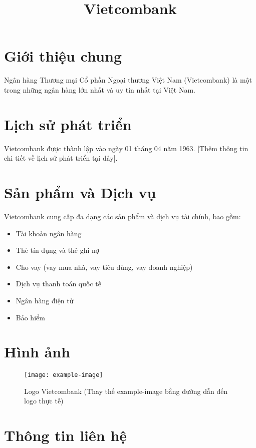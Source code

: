 \documentclass{article}
\title{Vietcombank}
\author{}
\date{}
\begin{document}
\maketitle

\section{Giới thiệu chung}

Ngân hàng Thương mại Cổ phần Ngoại thương Việt Nam (Vietcombank) là một trong những ngân hàng lớn nhất và uy tín nhất tại Việt Nam.

\section{Lịch sử phát triển}

Vietcombank được thành lập vào ngày 01 tháng 04 năm 1963.  [Thêm thông tin chi tiết về lịch sử phát triển tại đây].

\section{Sản phẩm và Dịch vụ}

Vietcombank cung cấp đa dạng các sản phẩm và dịch vụ tài chính, bao gồm:

\begin{itemize}
    \item Tài khoản ngân hàng
    \item Thẻ tín dụng và thẻ ghi nợ
    \item Cho vay (vay mua nhà, vay tiêu dùng, vay doanh nghiệp)
    \item Dịch vụ thanh toán quốc tế
    \item Ngân hàng điện tử
    \item Bảo hiểm
\end{itemize}

\section{Hình ảnh}

\begin{figure}[h!]
    \centering
    \texttt{[image: example-image]}
    \caption{Logo Vietcombank (Thay thế example-image bằng đường dẫn đến logo thực tế)}
    \label{fig:logo}
\end{figure}

\section{Thông tin liên hệ}
\end{document}
